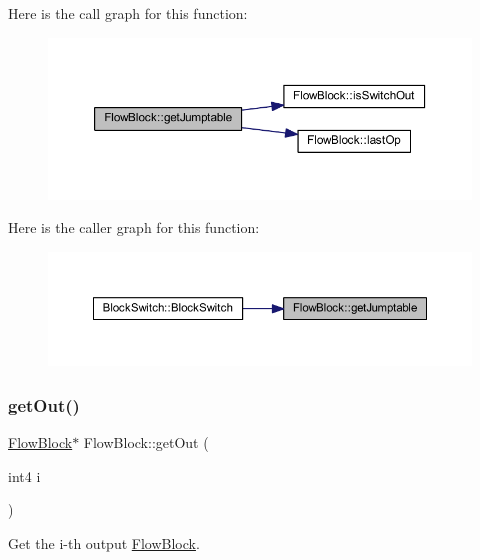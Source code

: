 Here is the call graph for this function\+:
\nopagebreak
\begin{figure}[H]
\begin{center}
\leavevmode
\includegraphics[width=350pt]{class_flow_block_a6791d31146a1bb676caa165ad5950c2d_cgraph}
\end{center}
\end{figure}
Here is the caller graph for this function\+:
\nopagebreak
\begin{figure}[H]
\begin{center}
\leavevmode
\includegraphics[width=350pt]{class_flow_block_a6791d31146a1bb676caa165ad5950c2d_icgraph}
\end{center}
\end{figure}
\mbox{\label{class_flow_block_ab95b430d4c8470c379dba93613c3073b}} 
\subsubsection{\texorpdfstring{getOut()}{getOut()}\hspace{0.1cm}{\footnotesize\ttfamily [1/2]}}
{\footnotesize\ttfamily \mbox{\hyperlink{class_flow_block}{Flow\+Block}}$\ast$ Flow\+Block\+::get\+Out (\begin{DoxyParamCaption}\item[{int4}]{i }\end{DoxyParamCaption})\hspace{0.3cm}{\ttfamily [inline]}}



Get the i-\/th output \mbox{\hyperlink{class_flow_block}{Flow\+Block}}. 



